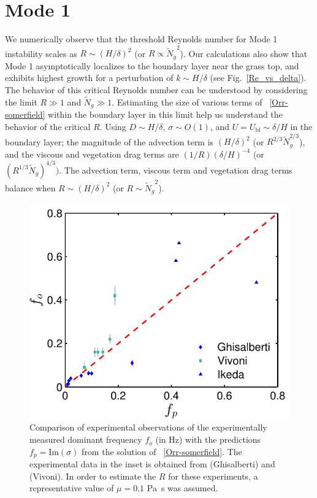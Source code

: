 \documentclass[12pt]{report}   %
\newcommand{\Rey}{{R}}
\newcommand{\Ndg}{\tilde{N}_g}
\newcommand{\ubl}{U_\text{bl}}
\begin{document}
\section{Mode 1}
We numerically observe that the threshold Reynolds number for Mode 1 instability scales as  $\Rey \sim (H/\delta)^2$ (or $\Rey \propto {\Ndg}^{2}$). 
Our calculations also show that Mode 1 asymptotically localizes to the boundary layer near the grass top, and exhibits highest growth for a perturbation of  $k \sim H/\delta$ (see Fig.~\ref{Re_vs_delta}). 
The behavior of this critical Reynolds number can be understood by considering the limit $\Rey \gg 1$ and $\Ndg \gg 1$.
Estimating the size of various terms of ~\eqref{Orr-somerfield} within the boundary layer in this limit help us understand the behavior of the critical $\Rey$. 
Using $D\sim H/\delta$, $\sigma \sim O(1)$, and $U=\ubl \sim \delta/H$ in the boundary layer; the magnitude of the advection term is $ (H/\delta)^2$  (or $\Rey^{2/3} \Ndg^{2/3}$), and the viscous and vegetation drag terms are $(1/\Rey) (\delta/H)^{-4}$ (or $(\Rey^{1/3} \Ndg)^{4/3})$. 
The advection term, viscous term and vegetation drag terms balance when $\Rey \sim (H/\delta)^2$ (or $\Rey \sim {\Ndg}^{2}$).

\begin{figure}
\centerline{\includegraphics[]{new_graph_freq}}
\caption{Comparison of experimental observations of the experimentally measured dominant frequency $f_o$ (in Hz) with the predictions $f_p=\text{Im}(\sigma)$ from the solution of ~\eqref{Orr-somerfield}. 
The experimental data in the inset is obtained from \cite{Ghisal02} (Ghisalberti) and \cite{Vivoni98} (Vivoni). 
In order to estimate the $\Rey$ for these experiments, a representative value of $\mu=0.1$ Pa~s was assumed.
}
\label{frequency_comparison}
\end{figure}
\end{document}
